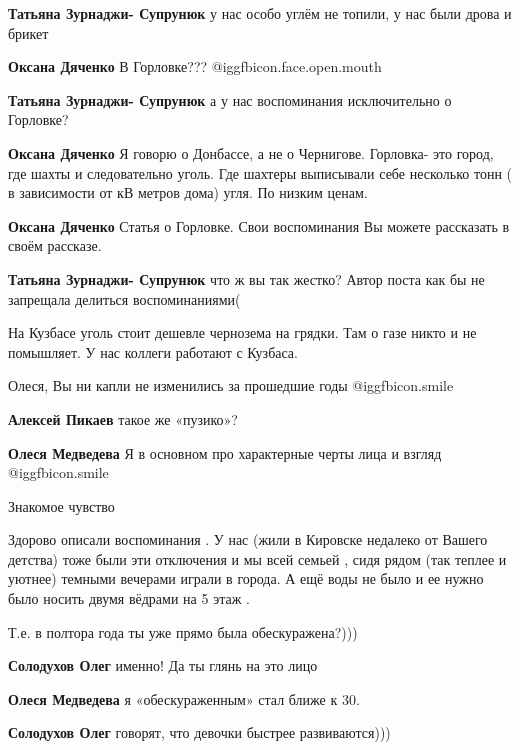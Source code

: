 \begin{itemize}
\begin{itemize}
\textbf{Татьяна Зурнаджи- Супрунюк} у нас особо углём не топили, у нас были дрова и брикет

\textbf{Оксана Дяченко} В Горловке??? @igg{fbicon.face.open.mouth} 

\textbf{Татьяна Зурнаджи- Супрунюк} а у нас воспоминания исключительно о Горловке?

\textbf{Оксана Дяченко} Я говорю о Донбассе, а не о Чернигове. Горловка- это город, где шахты и следовательно уголь. Где шахтеры выписывали себе несколько тонн ( в зависимости от кВ метров дома) угля. По низким ценам.

\textbf{Оксана Дяченко} Статья о Горловке. Свои воспоминания Вы можете рассказать в своём рассказе.

\textbf{Татьяна Зурнаджи- Супрунюк} что ж вы так жестко? Автор поста как бы не запрещала делиться воспоминаниями(

На Кузбасе уголь стоит дешевле чернозема на грядки. Там о газе никто и не помышляет. У нас коллеги работают с Кузбаса.
\end{itemize} %

Олеся, Вы ни капли не изменились за прошедшие годы  @igg{fbicon.smile} 


\textbf{Алексей Пикаев} такое же «пузико»?

\textbf{Олеся Медведева} Я в основном про характерные черты лица и взгляд  @igg{fbicon.smile} 

Знакомое чувство


Здорово описали воспоминания . У нас (жили в Кировске недалеко от Вашего
детства) тоже были эти отключения и мы всей семьей , сидя рядом (так теплее и
уютнее) темными вечерами играли в города. А ещё воды не было и ее нужно было
носить двумя вёдрами на 5 этаж .

Т.е. в полтора года ты уже прямо была обескуражена?)))

\begin{itemize} %
\textbf{Солодухов Олег} именно! Да ты глянь на это лицо

\textbf{Олеся Медведева} я «обескураженным» стал ближе к 30.


\textbf{Солодухов Олег} говорят, что девочки быстрее развиваются)))
\end{itemize} %


\end{itemize}
